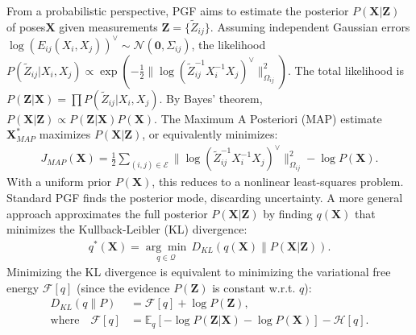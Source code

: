 From a probabilistic perspective, PGF aims to estimate the posterior $P({\mathbf{X}} | {\mathbf{Z}})$ 
of poses${\mathbf{X}}$ given measurements ${\mathbf{Z}} = \{{\tilde{Z}}_{ij}\}$. Assuming independent Gaussian errors $\log(E_{ij}(X_i,X_j))^{\vee} \sim {\mathcal{N}}({\mathbf{0}}, \Sigma_{ij})$, the likelihood $P({\tilde{Z}}_{ij} | X_i, X_j) \propto \exp( -\frac{1}{2} \| \log({\tilde{Z}}_{ij}^{-1} X_i^{-1} X_j)^{\vee} \|^2_{\Omega_{ij}} )$.
The total likelihood is $P({\mathbf{Z}} | {\mathbf{X}}) = \prod P({\tilde{Z}}_{ij} | X_i, X_j)$.
By Bayes' theorem, $P({\mathbf{X}} | {\mathbf{Z}}) \propto P({\mathbf{Z}} | {\mathbf{X}}) P({\mathbf{X}})$.
The Maximum A Posteriori (MAP) estimate ${\mathbf{X}}^*_{MAP}$ maximizes $P({\mathbf{X}} | {\mathbf{Z}})$, or equivalently minimizes:
\begin{equation}
\begin{aligned}
J_{MAP}({\mathbf{X}}) = \frac{1}{2} \sum_{(i,j) \in {\mathcal{E}}} \| \log({\tilde{Z}}_{ij}^{-1} X_i^{-1} X_j)^{\vee} \|^2_{\Omega_{ij}} - \log P({\mathbf{X}}).
\label{eq:map_estimation_min_pgf}
\end{aligned}
\end{equation}
With a uniform prior $P({\mathbf{X}})$, this reduces to a nonlinear least-squares problem.
Standard PGF finds the posterior mode, discarding uncertainty. A more general approach approximates the full posterior $P({\mathbf{X}} | {\mathbf{Z}})$ by finding $q({\mathbf{X}})$ that minimizes the Kullback-Leibler (KL) divergence:
\begin{equation}
\begin{aligned}
q^*({\mathbf{X}}) = \underset{q \in {\mathcal{Q}}}{\arg\min} \, D_{KL}(q({\mathbf{X}}) \| P({\mathbf{X}} | {\mathbf{Z}})).
\label{eq:kl_min_objective}
\end{aligned}
\end{equation}
Minimizing the KL divergence is equivalent to minimizing the variational free energy ${\mathcal{F}}[q]$ (since the evidence $P({\mathbf{Z}})$ is constant w.r.t. $q$):
\begin{equation}
\begin{aligned}
D_{KL}(q \| P) %
&= {\mathcal{F}}[q] + \log P({\mathbf{Z}}), \\
\text{where} \quad {\mathcal{F}}[q] &= \mathbb{E}_q[-\log P({\mathbf{Z}} | {\mathbf{X}}) - \log P({\mathbf{X}})] - {\mathcal{H}}[q].
\label{eq:kl_free_energy}
\end{aligned}
\end{equation}
